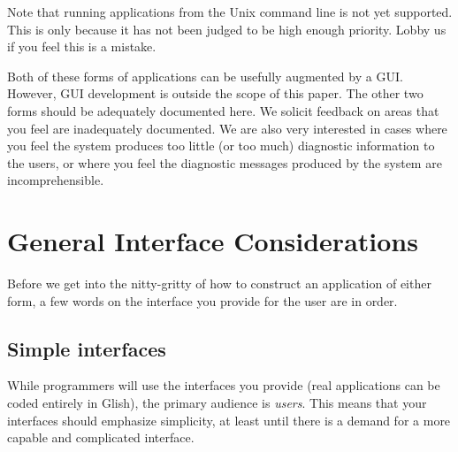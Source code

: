 Note that running applications from the Unix command line is not yet
supported. This is only because it has not been judged to be high
enough priority. Lobby us if you feel this is a mistake.

Both of these forms of applications can be usefully augmented by a
GUI. However, GUI development is outside the scope of this paper.
The other two forms should be adequately documented here. We
solicit feedback on areas that you feel are inadequately
documented. We are also very interested in cases where you feel the
system produces too little (or too much) diagnostic information to the
users, or where you feel the diagnostic messages produced by the
system are incomprehensible.

\section{General Interface Considerations}
\label{sec:interface}

Before we get into the nitty-gritty of how to construct an application
of either form, a few words on the interface you provide for the user
are in order.

\subsection{Simple interfaces}

While programmers will use the interfaces you provide (real applications
can be coded entirely in Glish), the primary audience is {\em
users}. This means that your interfaces should emphasize simplicity, at
least until there is a demand for a more capable and complicated
interface.

